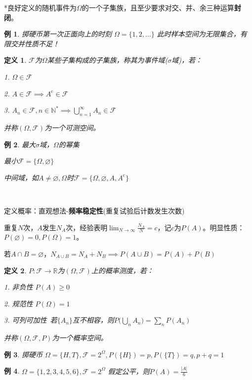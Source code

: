 \documentclass[a4paper,UTF8,fontset=windows]{ctexart}
\newtheorem{exmp}{例}[section]
\newtheorem{defi}{定义}[section]
\begin{document}
*良好定义的随机事件为$\Omega$的一个子集族，且至少要求对交、并、余三种运算\textbf{封闭}。

\begin{exmp}
掷硬币第一次正面向上的时刻 $\Omega=\{1,2,\dots\}$ 此时样本空间为无限集合，有限交并性质不足！
\end{exmp}

\begin{defi}
$\mathcal{F}$为$\Omega$某些子集构成的子集族，称其为事件域($\sigma$域)，若：

1. $\Omega\in\mathcal{F}$

2. $A\in\mathcal{F}\implies A^\mathrm{c}\in\mathcal{F}$

3. $A_n\in\mathcal{F},n\in\mathbb{N}^*\implies\bigcup_{n=1}^{\infty}A_n\in\mathcal{F}$

并称$(\Omega,\mathcal{F})$为一个可测空间。
\end{defi}

\begin{exmp}
最大$\sigma$域，$\Omega$的幂集

最小$\mathcal{F}=\{\Omega,\varnothing\}$ 

中间域，如$A\neq\varnothing,\Omega$时$\mathcal{F}=\{\Omega,\varnothing,A,A^\mathrm{c}\}$
\end{exmp}

~

定义概率：直观想法-\textbf{频率稳定性}(重复试验后计数发生次数)

重复$N$次，$A$发生$N_A$次，经验表明$\lim_{N\to\infty}\frac{N_A}{N}=c$，记$c$为$P(A)$。明显性质：$P(\varnothing)=0,P(\Omega)=1$。

若$A\cap B=\varnothing$，$N_{A\cup B}=N_A+N_B\implies P(A\cup B)=P(A)+P(B)$

\begin{defi}
$P:\mathcal{F}\to\mathbb{R}$为$(\Omega,\mathcal{F})$上的概率测度，若：

1. 非负性 $P(A)\ge0$

2. 规范性 $P(\Omega)=1$

3. 可列可加性\ 若$\{A_n\}$互不相容，则$P\bigg(\bigcup_{n}A_n\bigg)=\sum_nP(A_n)$

并称$(\Omega,\mathcal{F},P)$为一个概率空间。
\end{defi}

\begin{exmp}
掷硬币 $\Omega=\{H,T\},\mathcal{F}=2^\Omega,P(\{H\})=p,P(\{T\})=q,p+q=1$
\end{exmp}

\begin{exmp}
$\Omega=\{1,2,3,4,5,6\},\mathcal{F}=2^\Omega$ 假定公平，则$P(A)=\frac{|A|}{6}$
\end{exmp}
\end{document}

